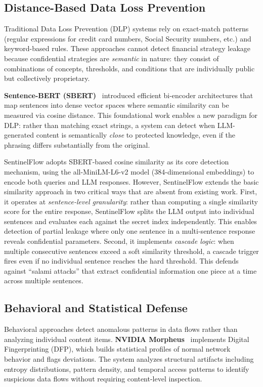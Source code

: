 \documentclass[journal,12pt,onecolumn,draftclsnofoot]{IEEEtran}
\begin{document}
\subsection{Distance-Based Data Loss Prevention}
\label{Sect:LR_DLP}

Traditional Data Loss Prevention (DLP) systems rely on exact-match patterns (regular expressions for credit card numbers, Social Security numbers, etc.) and keyword-based rules. These approaches cannot detect financial strategy leakage because confidential strategies are \textit{semantic} in nature: they consist of combinations of concepts, thresholds, and conditions that are individually public but collectively proprietary.

\textbf{Sentence-BERT (SBERT)}~\cite{sbert} introduced efficient bi-encoder architectures that map sentences into dense vector spaces where semantic similarity can be measured via cosine distance. This foundational work enables a new paradigm for DLP: rather than matching exact strings, a system can detect when LLM-generated content is semantically \textit{close} to protected knowledge, even if the phrasing differs substantially from the original.

SentinelFlow adopts SBERT-based cosine similarity as its core detection mechanism, using the all-MiniLM-L6-v2 model (384-dimensional embeddings) to encode both queries and LLM responses. However, SentinelFlow extends the basic similarity approach in two critical ways that are absent from existing work. First, it operates at \textit{sentence-level granularity}: rather than computing a single similarity score for the entire response, SentinelFlow splits the LLM output into individual sentences and evaluates each against the secret index independently. This enables detection of partial leakage where only one sentence in a multi-sentence response reveals confidential parameters. Second, it implements \textit{cascade logic}: when multiple consecutive sentences exceed a soft similarity threshold, a cascade trigger fires even if no individual sentence reaches the hard threshold. This defends against ``salami attacks'' that extract confidential information one piece at a time across multiple sentences.

\subsection{Behavioral and Statistical Defense}
\label{Sect:LR_Behavioral}

Behavioral approaches detect anomalous patterns in data flows rather than analyzing individual content items. \textbf{NVIDIA Morpheus}~\cite{nvidia_morpheus} implements Digital Fingerprinting (DFP), which builds statistical profiles of normal network behavior and flags deviations. The system analyzes structural artifacts including entropy distributions, pattern density, and temporal access patterns to identify suspicious data flows without requiring content-level inspection.
\end{document}
